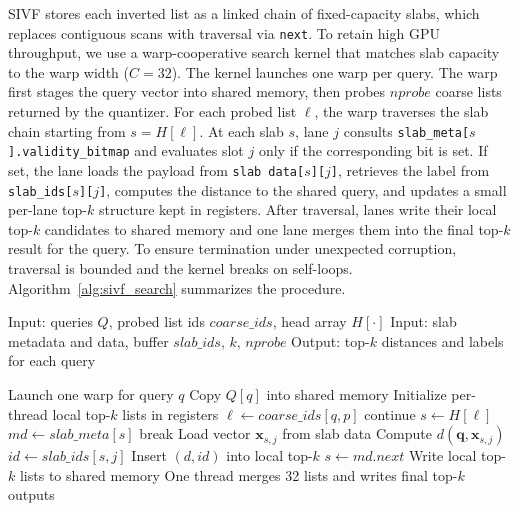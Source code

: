 \documentclass[sigconf,nonacm]{acmart}
\theoremstyle{plain}
\theoremstyle{definition}
\theoremstyle{remark}
\begin{document}
SIVF stores each inverted list as a linked chain of fixed-capacity slabs, which replaces contiguous scans with traversal via
\texttt{next}. To retain high GPU throughput, we use a warp-cooperative search kernel that matches slab capacity to the warp
width ($C=32$). The kernel launches one warp per query. The warp first stages the query vector into shared memory, then probes
$nprobe$ coarse lists returned by the quantizer. For each probed list $\ell$, the warp traverses the slab chain starting from
$s=H[\ell]$. At each slab $s$, lane $j$ consults \texttt{slab\_meta[$s$].validity\_bitmap} and evaluates slot $j$ only if the
corresponding bit is set. If set, the lane loads the payload from \texttt{slab data[$s$][$j$]}, retrieves the label from
\texttt{slab\_ids[$s$][$j$]}, computes the distance to the shared query, and updates a small per-lane top-$k$ structure kept in
registers. After traversal, lanes write their local top-$k$ candidates to shared memory and one lane merges them into the final
top-$k$ result for the query. To ensure termination under unexpected corruption, traversal is bounded and the kernel breaks on
self-loops. Algorithm~\ref{alg:sivf_search} summarizes the procedure.

\begin{algorithm}[t]
\caption{Warp-cooperative search in SIVF}
\label{alg:sivf_search}
\begin{algorithmic}[1]
\State Input: queries $Q$, probed list ids $coarse\_ids$, head array $H[\cdot]$
\State Input: slab metadata and data, buffer $slab\_ids$, $k$, $nprobe$
\State Output: top-$k$ distances and labels for each query

    \State Launch one warp for query $q$
    \State Copy $Q[q]$ into shared memory
    \State Initialize per-thread local top-$k$ lists in registers
        \State $\ell \gets coarse\_ids[q,p]$
         \State continue \EndIf
        \State $s \gets H[\ell]$
            \State $md \gets slab\_meta[s]$
             \State break \EndIf
                \State Load vector $\mathbf{x}_{s,j}$ from slab data
                \State Compute $d(\mathbf{q}, \mathbf{x}_{s,j})$
                \State $id \gets slab\_ids[s,j]$
                \State Insert $(d,id)$ into local top-$k$
            \EndIf
            \State $s \gets md.next$
        \EndWhile
    \EndFor
    \State Write local top-$k$ lists to shared memory
    \State One thread merges 32 lists and writes final top-$k$ outputs
\EndFor
\end{algorithmic}
\end{algorithm}
\end{document}
